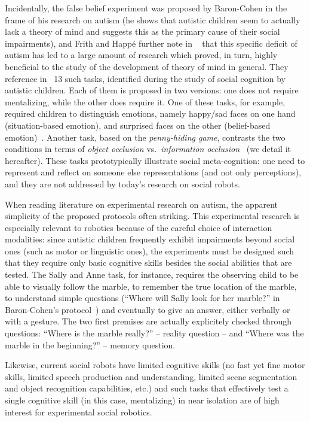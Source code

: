 \documentclass{sig-alternate}
\begin{document}
Incidentally, the false belief experiment was proposed by Baron-Cohen in the
frame of his research on autism (he shows that autistic children seem to
actually lack a theory of mind and suggests this as the primary cause of their
social impairments), and Frith and Happé further note in ~\cite{frith1994autism}
that this specific deficit of autism has led to a large amount of research which
proved, in turn, highly beneficial to the study of the development of theory of
mind in general. They reference in~\cite{frith1994autism} 13 such tasks, identified during
the study of social cognition by autistic children. Each of them is proposed in
two versions: one does not require mentalizing, while the other does require it.
One of these tasks, for example, required children to distinguish emotions,
namely happy/sad faces on one hand (situation-based emotion), and surprised
faces on the other (belief-based emotion)~\cite{baron1993children}.  Another
task, based on the \emph{penny-hiding game}, contrasts the two conditions in
terms of \emph{object occlusion} vs.~\emph{information
occlusion}~\cite{baron1992out} (we detail it hereafter). These tasks prototypically illustrate social
meta-cognition: one need to represent and reflect on someone else
representations (and not only perceptions), and they are not addressed by
today's research on social robots.

When reading literature on experimental research on autism, the apparent
simplicity of the proposed protocols often striking. This experimental research
is especially relevant to robotics because of the careful choice of interaction
modalities: since autistic children frequently exhibit impairments beyond social
ones (such as motor or linguistic ones), the experiments must be designed such
that they require only basic cognitive skills besides the social abilities that
are tested. The Sally and Anne task, for instance, requires the observing child
to be able to visually follow the marble, to remember the true location of the
marble, to understand simple questions (``Where will Sally look for her
marble?'' in Baron-Cohen's protocol~\cite{baron1985does}) and eventually to give
an answer, either verbally or with a gesture. The two first premises are
actually explicitely checked through questions: ``Where is the
marble really?'' -- reality question -- and ``Where was the marble in the
beginning?'' -- memory question.

Likewise, current social robots have limited cognitive skills (no fast yet fine
motor skills, limited speech production and understanding, limited scene
segmentation and object recognition capabilities, etc.) and such tasks
that effectively test a single cognitive skill (in this case, mentalizing) in
near isolation are of high interest for experimental social robotics.
\end{document}
